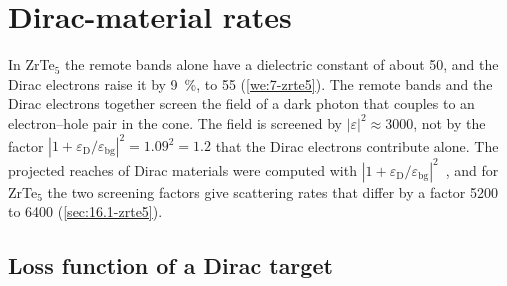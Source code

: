\section{Dirac-material rates}\label{sec:16.1}

In ZrTe$_5$ the remote bands alone have a dielectric constant of about 50, and the Dirac electrons raise it by \SI{9}{\percent}, to 55 (\cref{we:7-zrte5}). The remote bands and the Dirac electrons together screen the field of a dark photon that couples to an electron--hole pair in the cone. The field is screened by $|\varepsilon|^2 \approx 3000$, not by the factor $|1 + \varepsilon_{\mathrm{D}}/\varepsilon_{\mathrm{bg}}|^2 = 1.09^2 = 1.2$ that the Dirac electrons contribute alone. The projected reaches of Dirac materials were computed with $|1 + \varepsilon_{\mathrm{D}}/\varepsilon_{\mathrm{bg}}|^2$~\cite{hochberg2018detection,geilhufe2020dirac}, and for ZrTe$_5$ the two screening factors give scattering rates that differ by a factor 5200 to 6400 (\cref{sec:16.1-zrte5}).

\subsection{Loss function of a Dirac target}\label{sec:16.1-loss}

